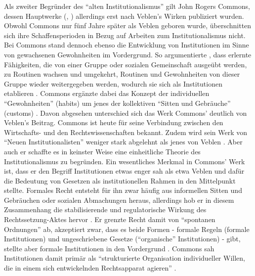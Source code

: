 Als zweiter Begründer des "`alten Institutionalismus"' gilt John Rogers Commons, dessen Hauptwerke (\textcite{Commons1924}, \textcite{Commons1934}) allerdings erst nach Veblen's Wirken publiziert wurden. Obwohl Commons nur fünf Jahre später als Veblen geboren wurde, überschnitten sich ihre Schaffensperioden in Bezug auf Arbeiten zum Institutionalismus nicht. Bei Commons stand dennoch ebenso die Entwicklung von Institutionen im Sinne von gewachsenen Gewohnheiten im Vordergrund. So argumentierte \textcite[S. 45]{Commons1934}, dass erlernte Fähigkeiten, die von einer Gruppe oder sozialen Gemeinschaft ausgeübt werden, zu Routinen wachsen und umgekehrt, Routinen und Gewohnheiten von dieser Gruppe wieder weitergegeben werden, wodurch sie sich als Institutionen etablieren \parencite[S. 180]{Hodgson1998}. Commons ergänzte dabei das Konzept der individuellen "`Gewohnheiten"' (habits) um jenes der kollektiven "`Sitten und Gebräuche"' (customs) \parencite[S. 556ff]{Hodgson2003}. Davon abgesehen unterschied sich das Werk Commons' deutlich von Veblen's Beitrag. Commons ist heute für seine Verbindung zwischen den Wirtschafts- und den Rechtswissenschaften bekannt. Zudem wird sein Werk von "`Neuen Institutionalisten"' weniger stark abgelehnt als jenes von Veblen \parencite[S. 547]{Hodgson2003}. Aber auch er schaffte es in keinster Weise eine einheitliche Theorie des Institutionalismus zu begründen. Ein wesentliches Merkmal in Commons' Werk ist, dass er den Begriff Institutionen etwas enger sah als etwa Veblen und dafür die Bedeutung von Gesetzen als institutionellen Rahmen in den Mittelpunkt stellte. Formales Recht entsteht für ihn zwar häufig aus informellen Sitten und Gebräuchen oder sozialen Abmachungen heraus, allerdings hob er in diesem Zusammenhang die stabilisierende und regulatorische Wirkung des Rechtssetzung-Aktes hervor \parencite[S. 566]{Hodgson2003}. Er grenzte Recht damit von "`spontanen Ordnungen"' ab, akzeptiert zwar, dass es beide Formen - formale Regeln (formale Institutionen) und ungeschriebene Gesetze ("`organische"' Institutionen) - gibt, stellte aber formale Institutionen in den Vordergrund \parencite[S. 568]{Hodgson2003}. Commons sah Institutionen damit primär als "`strukturierte Organisation individueller Willen, die in einem sich entwickelnden Rechtsapparat agieren"' \parencite[S. 568]{Hodgson2003}.

